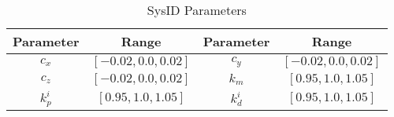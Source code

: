 \begin{table}[htp]
    \centering
    \small %
    \setlength{\tabcolsep}{2pt} %
    \caption{SysID Parameters}
    \label{tab:sysid_params}
    \begin{tabular}{cccc}
        \toprule
        Parameter & Range & Parameter & Range \\
        \midrule
        $c_x$ & $[-0.02, 0.0, 0.02]$ & $c_y$ & $[-0.02, 0.0, 0.02]$ \\
        $c_z$ & $[-0.02, 0.0, 0.02]$ & $k_m$ & $[0.95, 1.0, 1.05]$ \\
        $k^i_p$ & $[0.95, 1.0, 1.05]$ & $k^i_d$ & $[0.95, 1.0, 1.05]$ \\
        \bottomrule
    \end{tabular}
\end{table}